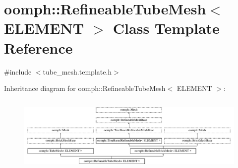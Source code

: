 \hypertarget{classoomph_1_1RefineableTubeMesh}{}\section{oomph\+:\+:Refineable\+Tube\+Mesh$<$ E\+L\+E\+M\+E\+NT $>$ Class Template Reference}
\label{classoomph_1_1RefineableTubeMesh}


{\ttfamily \#include $<$tube\+\_\+mesh.\+template.\+h$>$}

Inheritance diagram for oomph\+:\+:Refineable\+Tube\+Mesh$<$ E\+L\+E\+M\+E\+NT $>$\+:\begin{figure}[H]
\begin{center}
\leavevmode
\includegraphics[height=3.771044cm]{classoomph_1_1RefineableTubeMesh}
\end{center}
\end{figure}
